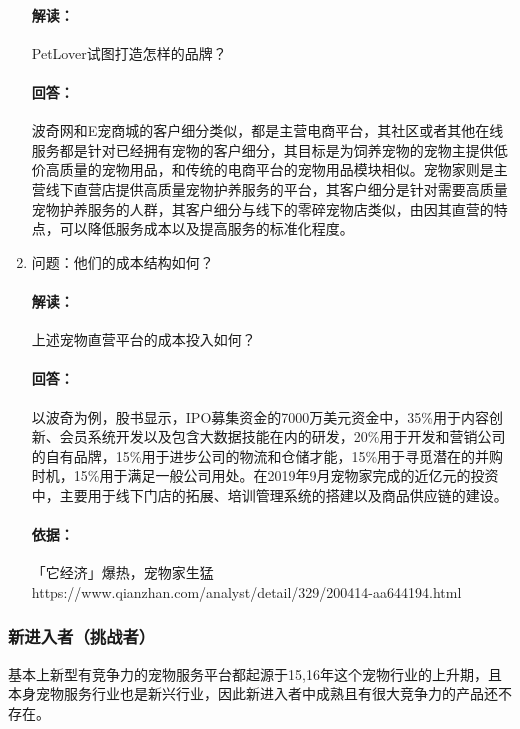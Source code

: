 \documentclass[a4paper]{ctexart}
\begin{document}
\begin{enumerate}[label=\alph*.]
  \paragraph{解读：}PetLover试图打造怎样的品牌？
  \paragraph{回答：}波奇网和E宠商城的客户细分类似，都是主营电商平台，其社区或者其他在线服务都是针对已经拥有宠物的客户细分，其目标是为饲养宠物的宠物主提供低价高质量的宠物用品，和传统的电商平台的宠物用品模块相似。宠物家则是主营线下直营店提供高质量宠物护养服务的平台，其客户细分是针对需要高质量宠物护养服务的人群，其客户细分与线下的零碎宠物店类似，由因其直营的特点，可以降低服务成本以及提高服务的标准化程度。
  \item 问题：他们的成本结构如何？
  \paragraph{解读：}上述宠物直营平台的成本投入如何？
  \paragraph{回答：}以波奇为例，股书显示，IPO募集资金的7000万美元资金中，35\%用于内容创新、会员系统开发以及包含大数据技能在内的研发，20\%用于开发和营销公司的自有品牌，15\%用于进步公司的物流和仓储才能，15\%用于寻觅潜在的并购时机，15\%用于满足一般公司用处。在2019年9月宠物家完成的近亿元的投资中，主要用于线下门店的拓展、培训管理系统的搭建以及商品供应链的建设。
  \paragraph{依据：}「它经济」爆热，宠物家生猛 https://www.qianzhan.com/analyst/detail/329/200414-aa644194.html
\end{enumerate}
\subsubsection{新进入者（挑战者）}
基本上新型有竞争力的宠物服务平台都起源于15,16年这个宠物行业的上升期，且本身宠物服务行业也是新兴行业，因此新进入者中成熟且有很大竞争力的产品还不存在。
\end{document}
